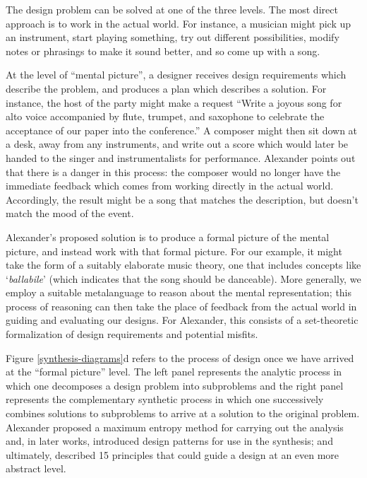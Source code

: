 \documentclass[acmlarge,timestamp]{acmart}
\begin{document}
The design problem can be solved at one of the three levels.  The most
direct approach is to work in the actual world.  For instance, a
musician might pick up an instrument, start playing something, try out
different possibilities, modify notes or phrasings to make it sound
better, and so come up with a song.

At the level of ``mental picture'', a designer receives design
requirements which describe the problem, and produces a plan which
describes a solution.  For instance, the host of the party might make
a request ``Write a joyous song for alto voice accompanied by flute,
trumpet, and saxophone to celebrate the acceptance of our paper into
the conference.''  A composer might then sit down at a desk, away from
any instruments, and write out a score which would later be handed to
the singer and instrumentalists for performance.  Alexander points out
that there is a danger in this process: the composer would no longer
have the immediate feedback which comes from working directly in the
actual world.  Accordingly, the result might be a song that matches
the description, but doesn’t match the mood of the event.

Alexander’s proposed solution is to produce a formal picture of the
mental picture, and instead work with that formal picture.  For our
example, it might take the form of a suitably elaborate music theory,
one that includes concepts like ‘\emph{ballabile}’ (which indicates
that the song should be danceable).  More generally, we employ a
suitable metalanguage to reason about the mental representation; this
process of reasoning can then take the place of feedback from the
actual world in guiding and evaluating our designs.  For Alexander,
this consists of a set-theoretic formalization of design requirements
and potential misfits.


Figure \ref{synthesis-diagrams}d refers to the process of design once
we have arrived at the ``formal picture'' level.  The left panel
represents the analytic process in which one decomposes a design
problem into subproblems and the right panel represents the
complementary synthetic process in which one successively combines
solutions to subproblems to arrive at a solution to the original
problem.  Alexander proposed a maximum entropy method for carrying out
the analysis and, in later works, introduced design patterns for use
in the synthesis; and ultimately, described 15 principles that could
guide a design at an even more abstract level.
\end{document}
